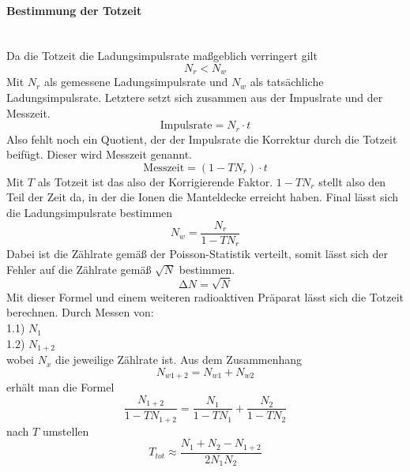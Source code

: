 \paragraph{Bestimmung der Totzeit} 
\label{para:Totzeit}
\mbox{} \\
Da die Totzeit die Ladungsimpulsrate maßgeblich verringert gilt
\begin{equation*}
\label{ref:totzeitverhaeltnis}
N_r < N_w
\end{equation*}
Mit $N_r$ als gemessene Ladungsimpulsrate und $N_w$ als tatsächliche Ladungsimpulsrate. 
Letztere setzt sich zusammen aus der Impuslrate und der Messzeit.
\begin{equation*}
\text{Impulsrate} = N_r \cdot t
\end{equation*} 
Also fehlt noch ein Quotient, der der Impulsrate die Korrektur durch die Totzeit beifügt. Dieser wird Messzeit genannt.
\begin{equation*}
\text{Messzeit} = (1-TN_r) \cdot t
\end{equation*}
Mit $T$ als Totzeit ist das also der Korrigierende Faktor. $1-TN_r$ stellt also den Teil der Zeit da, in der die Ionen die Manteldecke erreicht haben.
Final lässt sich die Ladungsimpulsrate bestimmen 
\begin{equation}
\label{ref:Ladungsimpulsrate}
N_w = \frac{N_r}{1-TN_r}
\end{equation}
Dabei ist die Zählrate gemäß der Poisson-Statistik verteilt, somit lässt sich der Fehler auf die Zählrate gemäß $\sqrt{N}$
bestimmen.
\begin{equation}
\label{eqn:fehlerzählrate} %
\increment N = \sqrt{N}
\end{equation}
Mit dieser Formel und einem weiteren radioaktiven Präparat  lässt sich die Totzeit berechnen. 
Durch Messen von:\\
1.1)  $N_1$  \\
1.2) $N_{1+2}$\\
wobei $N_x$ die jeweilige Zählrate ist.
Aus dem Zusammenhang 
\begin{equation*}
N_{w1+2} = N_{w1} + N_{w2}
\end{equation*}
erhält man die Formel
\begin{equation*}
\frac{N_{1+2}}{1-TN_{1+2}}=\frac{N_1}{1-TN_1} + \frac{N_2}{1-TN_2}
\end{equation*}
nach $T$ umstellen
\begin{equation}
\label{eqn:totzeit}
T_{tot} \approx \frac{N_1+N_2-N_{1+2}}{2N_1N_2}
\end{equation}


